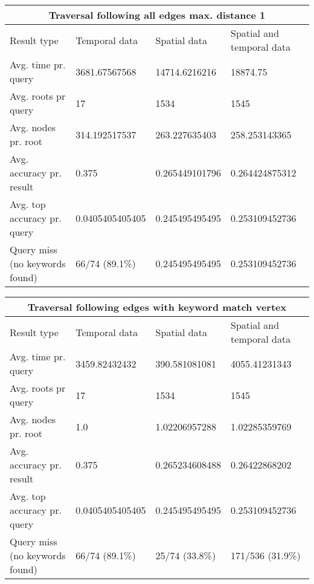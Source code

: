 \begin{tabular}{ |p{3cm}||p{3cm}|p{3cm}|p{3cm}|  }
	\hline
	\multicolumn{4}{|c|}{Traversal following all edges max. distance 1}                           \\
	\hline
	Result type                    & Temporal data   & Spatial data   & Spatial and temporal data \\
	\hline
	Avg. time pr. query            & 3681.67567568   & 14714.6216216  & 18874.75                  \\
	Avg. roots pr query            & 17              & 1534           & 1545                      \\
	Avg. nodes pr. root            & 314.192517537   & 263.227635403  & 258.253143365             \\
	Avg. accuracy pr. result       & 0.375           & 0.265449101796 & 0.264424875312            \\
	Avg. top accuracy pr. query    & 0.0405405405405 & 0.245495495495 & 0.253109452736            \\
	Query miss (no keywords found) & 66/74 (89.1\%)  & 0.245495495495 & 0.253109452736            \\
	\hline
\end{tabular}

\begin{tabular}{ |p{3cm}||p{3cm}|p{3cm}|p{3cm}|  }
	\hline
	\multicolumn{4}{|c|}{Traversal following edges with keyword match vertex}                     \\
	\hline
	Result type                    & Temporal data   & Spatial data   & Spatial and temporal data \\
	\hline
	Avg. time pr. query            & 3459.82432432   & 390.581081081  & 4055.41231343             \\
	Avg. roots pr query            & 17              & 1534           & 1545                      \\
	Avg. nodes pr. root            & 1.0             & 1.02206957288  & 1.02285359769             \\
	Avg. accuracy pr. result       & 0.375           & 0.265234608488 & 0.26422868202             \\
	Avg. top accuracy pr. query    & 0.0405405405405 & 0.245495495495 & 0.253109452736            \\
	Query miss (no keywords found) & 66/74 (89.1\%)  & 25/74 (33.8\%) & 171/536 (31.9\%)          \\
	\hline
\end{tabular}


